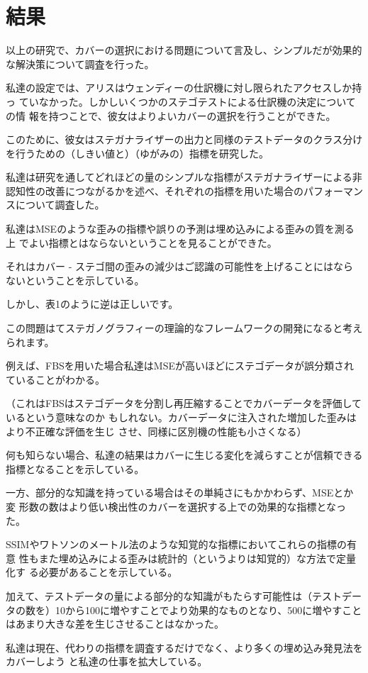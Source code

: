 \documentclass[a4j,fleqn,10pt]{jsarticle}
\begin{document}
\section{結果}
以上の研究で、カバーの選択における問題について言及し、シンプルだが効果的
な解決策について調査を行った。

私達の設定では、アリスはウェンディーの仕訳機に対し限られたアクセスしか持っ
ていなかった。しかしいくつかのステゴテストによる仕訳機の決定についての情
報を持つことで、彼女はよりよいカバーの選択を行うことができた。

このために、彼女はステガナライザーの出力と同様のテストデータのクラス分け
を行うための（しきい値と）（ゆがみの）指標を研究した。

私達は研究を通してどれほどの量のシンプルな指標がステガナライザーによる非
認知性の改善につながるかを述べ、それぞれの指標を用いた場合のパフォーマン
スについて調査した。

私達はMSEのような歪みの指標や誤りの予測は埋め込みによる歪みの質を測る上
でよい指標とはならないということを見ることができた。

それはカバー - ステゴ間の歪みの減少はご認識の可能性を上げることにはなら
ないということを示している。

しかし、表1のように逆は正しいです。

この問題はてステガノグラフィーの理論的なフレームワークの開発になると考え
られます。

例えば、FBSを用いた場合私達はMSEが高いほどにステゴデータが誤分類され
ていることがわかる。

（これはFBSはステゴデータを分割し再圧縮することでカバーデータを評価しているという意味なのか
もしれない。カバーデータに注入された増加した歪みはより不正確な評価を生じ
させ、同様に区別機の性能も小さくなる）

何も知らない場合、私達の結果はカバーに生じる変化を減らすことが信頼できる
指標となることを示している。

一方、部分的な知識を持っている場合はその単純さにもかかわらず、MSEとか変
形数の数はより低い検出性のカバーを選択する上での効果的な指標となった。

SSIMやワトソンのメートル法のような知覚的な指標においてこれらの指標の有意
性もまた埋め込みによる歪みは統計的（というよりは知覚的）な方法で定量化す
る必要があることを示している。

加えて、テストデータの量による部分的な知識がもたらす可能性は（テストデー
タの数を）10から100に増やすことでより効果的なものとなり、500に増やすこと
はあまり大きな差を生じさせることはなかった。

私達は現在、代わりの指標を調査するだけでなく、より多くの埋め込み発見法をカバーしよう
と私達の仕事を拡大している。
\end{document}
